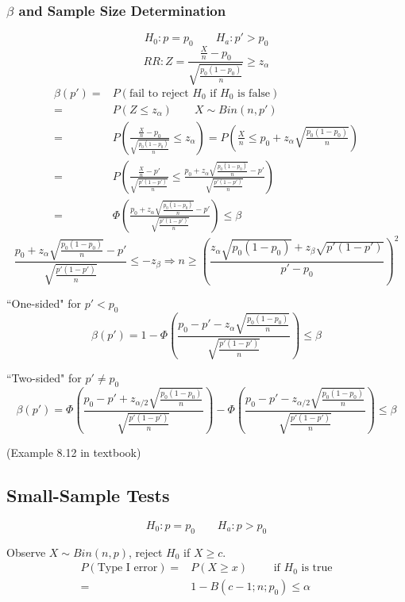 \subsubsection{$\beta$ and Sample Size Determination}
\[H_0:p=p_0 \qquad H_a:p'>p_0\]
\[RR:Z=\frac{\frac{X}{n}-p_0}{\sqrt{\frac{p_0(1-p_0)}{n}}}\geq z_{\alpha}\]
\begin{align*}
\beta(p') =& P(\text{fail to reject }H_0 \text{ if }H_0 \text{ is false}) \\
= & P(Z\leq z_{\alpha}) \qquad X \sim Bin(n,p') \\
= & P\left(\frac{\frac{X}{n}-p_0}{\sqrt{\frac{p_0(1-p_0)}{n}}} \leq z_{\alpha}\right) = P\left(\frac{X}{n}\leq p_0+z_{\alpha}\sqrt{\frac{p_0(1-p_0)}{n}} \right) \\
= & P\left( \frac{\frac{X}{n}-p'}{\sqrt{\frac{p'(1-p')}{n}}}  \leq \frac{p_0+z_{\alpha}\sqrt{\frac{p_0(1-p_0)}{n}}-p'}{\sqrt{\frac{p'(1-p')}{n}}} \right) \\
= & \Phi\left(\frac{p_0+z_{\alpha}\sqrt{\frac{p_0(1-p_0)}{n}}-p'}{\sqrt{\frac{p'(1-p')}{n}}}\right) \leq \beta
\end{align*}
\[\frac{p_0+z_{\alpha}\sqrt{\frac{p_0(1-p_0)}{n}}-p'}{\sqrt{\frac{p'(1-p')}{n}}} \leq -z_{\beta} \Rightarrow n \geq \left( \frac{z_{\alpha}\sqrt{p_0(1-p_0)}+z_{\beta}\sqrt{p'(1-p')}}{p'-p_0}\right)^2\]

``One-sided" for $p'<p_0$
\[\beta(p')= 1- \Phi\left(\frac{p_0-p'-z_{\alpha}\sqrt{\frac{p_0(1-p_0)}{n}}}{\sqrt{\frac{p'(1-p')}{n}}}\right) \leq \beta \]

``Two-sided" for $p'\neq p_0$
\[\beta(p')= \Phi\left(\frac{p_0-p'+z_{\alpha/2}\sqrt{\frac{p_0(1-p_0)}{n}}}{\sqrt{\frac{p'(1-p')}{n}}}\right)- \Phi\left(\frac{p_0-p'-z_{\alpha/2}\sqrt{\frac{p_0(1-p_0)}{n}}}{\sqrt{\frac{p'(1-p')}{n}}}\right) \leq \beta \]

\begin{exmp}
(Example 8.12 in textbook)
\end{exmp}

\subsection{Small-Sample Tests}
\[H_0:p=p_0 \qquad H_a:p>p_0\]

Observe $X \sim Bin(n,p)$, reject $H_0$ if $X\geq c$.
\begin{align*}
P(\text{Type I error})= & P(X \geq x) \qquad \text{ if }H_0 \text{ is true} \\
= & 1- B(c-1;n;p_0) \leq\alpha
\end{align*}

